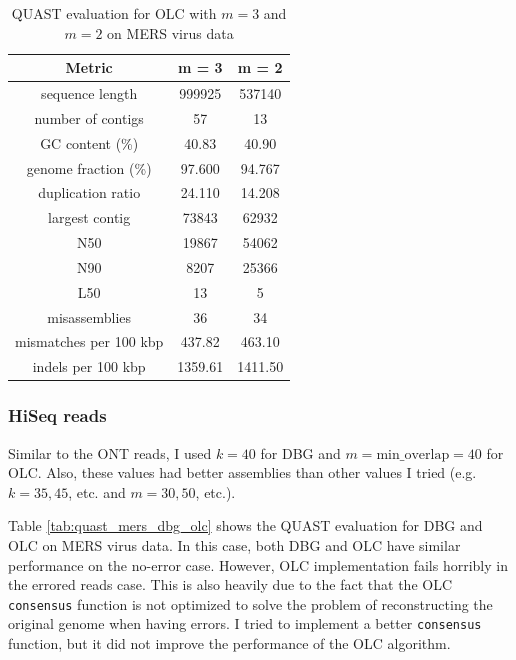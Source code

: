 \documentclass[12pt]{article}
\begin{document}
\begin{table}[h!]
\begin{center}
    \begin{tabular}{ |c|c|c| }
        \hline
        Metric               & m = 3 & m = 2 \\
        \hline
        sequence length      & 999925  & 537140   \\
        number of contigs    & 57      & 13        \\
        GC content (\%)      & 40.83  & 40.90    \\
        genome fraction (\%) & 97.600 & 94.767    \\
        duplication ratio    & 24.110  & 14.208    \\
        largest contig       & 73843  & 62932    \\
        N50                  & 19867  & 54062    \\
        N90                  & 8207  & 25366    \\
        L50                  & 13      & 5       \\
        misassemblies        & 36      & 34        \\
        mismatches per 100 kbp & 437.82 & 463.10     \\
        indels per 100 kbp   & 1359.61   & 1411.50     \\
        \hline
    \end{tabular}
    \end{center}
\caption{QUAST evaluation for OLC with $m = 3$ and $m = 2$ on MERS virus data}
\label{tab:quast_mers_olc_m3_m2}
\end{table}

\subsubsection{HiSeq reads}
Similar to the ONT reads, I used $k = 40$ for DBG and $m = \text{min\_overlap} = 40$ for OLC. Also, these values had better assemblies than other values I tried (e.g. $k = 35,45$, etc. and $m = 30,50$, etc.).

Table \ref{tab:quast_mers_dbg_olc} shows the QUAST evaluation for DBG and OLC on MERS virus data. In this case, both DBG and OLC have similar performance on the no-error case. However, OLC implementation fails horribly in the errored reads case.
This is also heavily due to the fact that the OLC \texttt{consensus} function is not optimized to solve the problem of reconstructing the original genome when having errors. I tried to implement a better \texttt{consensus} function, but it did not improve the performance of the OLC algorithm.
\end{document}
